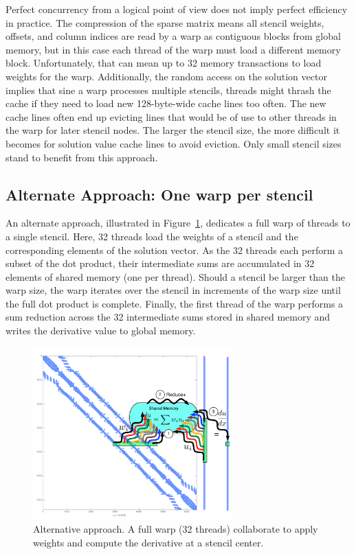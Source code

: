 \documentclass{report}
\begin{document}
Perfect concurrency from a logical point of view does not 
imply perfect efficiency in practice. The compression of the sparse matrix means all stencil weights, offsets, and column indices are read by a warp as contiguous blocks from global memory, but in this case each thread of the warp must load a different memory block. Unfortunately, that can mean up to 32 memory transactions to load weights for the warp. Additionally, the random access on the solution vector implies that sine a warp processes multiple stencils, threads might thrash the cache if they need to load new 128-byte-wide cache lines too often. The new cache lines often end up evicting lines that would be of use to other threads in the warp for later stencil nodes. The larger the stencil size, the more difficult it becomes for solution value cache lines to avoid eviction. Only small stencil sizes stand to benefit from this approach. 




\subsection{Alternate Approach: One warp per stencil} 

An alternate approach, illustrated in Figure~\ref{fig:oneWarpPerStencil}, dedicates a full warp of threads to a single stencil. Here, 32 threads load the weights of a stencil and the corresponding elements of the solution vector. As the 32 threads each perform a subset of the dot product, their intermediate sums are accumulated in 32 elements of shared memory (one per thread).
Should  a stencil be larger than the warp size, the warp iterates over the stencil in increments of the warp size until the full dot product is complete. Finally, the first thread of the warp performs a sum reduction across the 32 intermediate sums stored in shared memory and writes the derivative value to global memory. 

\begin{figure}[ht]
      \centering
       \includegraphics[width=3in]{../figures/paper1/figures/omnigraffle/oneWarpPerStencil.pdf}
      \caption{Alternative approach. A full warp (32 threads) collaborate to apply weights  and compute the derivative at a stencil center. }
      \label{fig:oneWarpPerStencil}
\end{figure}
\end{document}
